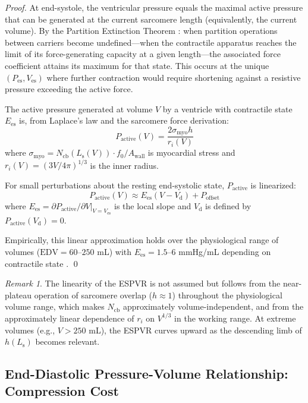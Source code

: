\documentclass[10pt,twocolumn,a4paper]{article}
\theoremstyle{remark}
\newtheorem{remark}[theorem]{Remark}
\newcommand{\Ees}{E_{\mathrm{es}}}
\newcommand{\Vd}{V_{\mathrm{d}}}
\newcommand{\EDV}{\mathrm{EDV}}
\newcommand{\Ncb}{N_{\mathrm{cb}}}
\newcommand{\Ls}{L_{\mathrm{s}}}
\begin{document}
\begin{proof}
At end-systole, the ventricular pressure equals the maximal active pressure that can be generated at the current sarcomere length (equivalently, the current volume). By the Partition Extinction Theorem \cite{sachikonye2024gas}: when partition operations between carriers become undefined—when the contractile apparatus reaches the limit of its force-generating capacity at a given length—the associated force coefficient attains its maximum for that state. This occurs at the unique $(P_{\mathrm{es}}, V_{\mathrm{es}})$ where further contraction would require shortening against a resistive pressure exceeding the active force.

The active pressure generated at volume $V$ by a ventricle with contractile state $\Ees$ is, from Laplace's law and the sarcomere force derivation:
\begin{equation}
    P_{\mathrm{active}}(V) = \frac{2 \sigma_{\mathrm{myo}} h}{r_i(V)}
\end{equation}
where $\sigma_{\mathrm{myo}} = \Ncb(\Ls(V)) \cdot f_0 / A_{\mathrm{wall}}$ is myocardial stress and $r_i(V) = (3V/4\pi)^{1/3}$ is the inner radius.

For small perturbations about the resting end-systolic state, $P_{\mathrm{active}}$ is linearized:
\begin{equation}
    P_{\mathrm{active}}(V) \approx \Ees(V - \Vd) + P_{\mathrm{offset}}
\end{equation}
where $\Ees = \partial P_{\mathrm{active}}/\partial V|_{V=V_{\mathrm{es}}}$ is the local slope and $\Vd$ is defined by $P_{\mathrm{active}}(\Vd) = 0$.

Empirically, this linear approximation holds over the physiological range of volumes ($\EDV = 60$--$250$ mL) with $\Ees = 1.5$--$6$ mmHg/mL depending on contractile state \cite{suga1974instantaneous}. \qed
\end{proof}

\begin{remark}
    The linearity of the ESPVR is not assumed but follows from the near-plateau operation of sarcomere overlap ($h \approx 1$) throughout the physiological volume range, which makes $\Ncb$ approximately volume-independent, and from the approximately linear dependence of $r_i$ on $V^{1/3}$ in the working range. At extreme volumes (e.g., $V > 250$ mL), the ESPVR curves upward as the descending limb of $h(\Ls)$ becomes relevant.
\end{remark}

\subsection{End-Diastolic Pressure-Volume Relationship: Compression Cost}
\end{document}
